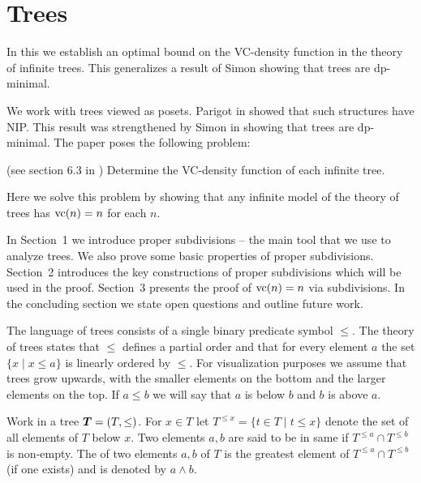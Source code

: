 \chapter{Trees}
In this \chapa we establish an optimal bound on the VC-density function in the theory of infinite trees.
This generalizes a result of Simon showing that trees are dp-minimal. 
 
We work with trees viewed as posets.
Parigot in \cite{parigot_trees} showed that such structures have NIP.
This result was strengthened by Simon in \cite{simon_dp_min} showing that trees are dp-minimal.
The paper \cite{density} poses the following problem:

\begin{Problem} (see section 6.3 in \cite{density})
  Determine the VC-density function of each infinite tree.
\end{Problem}

Here we solve this problem by showing that any infinite model of the theory of trees has $\operatorname{vc}(n) = n$ for each $n$.

In Sec\-tion~1 we introduce proper subdivisions -- the main tool that we use to analyze trees.
We also prove some basic properties of proper subdivisions.
Sec\-tion~2 introduces the key constructions of proper subdivisions which will be used in the proof.
Sec\-tion~3 presents the proof of $\operatorname{vc}(n) = n$ via subdivisions.
In the concluding section we state open questions and outline future work.

The language of trees consists of a single binary predicate symbol $\leq$. The theory of trees states that $\leq$ defines a partial order and that for every element $a$ the set $\{x \mid x \leq a\}$ is linearly ordered by $\leq$. For visualization purposes we assume that trees grow upwards, with the smaller elements on the bottom and the larger elements on the top. If $a \leq b$ we will say that $a$ is below $b$ and $b$ is above $a$.

\begin{Definition}
  Work in a tree $\operatorname{\boldsymbol T} = (T, \leq)$.
  For $x \in T$ let $T^{\leq x} = \{t \in T \mid t \leq x\}$ denote the set of all elements of $T$ below $x$.
  Two elements $a,b$ are said to be in same  if $T^{\leq a} \cap T^{\leq b}$ is non-empty.
  The  of two elements $a,b$ of $T$ is the greatest element of $T^{\leq a} \cap T^{\leq b}$ (if one exists) and is denoted by $a \wedge b$.
\end{Definition}

